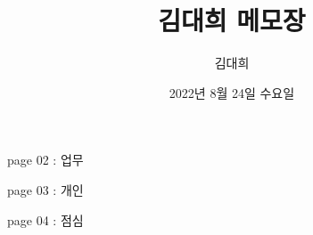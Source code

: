 \documentclass[aspectratio=1610,17pt,xcolor=pdftex,dvipsnames,table,handout]{beamer}
\begin{document}
	

			\title{김대희 메모장}

			\author{김대희}

			\date{ 	2022년 
					8월 
					24일 
					수요일 }


%
%
%
%
%
%
%
%
		\begin{frame}[plain]
		\titlepage
		\end{frame}

		\clearpage



		\begin{frame} [t,plain]

			\begin{block} { page 02  :  업무 }

			\end{block}			
								
		\end{frame}	 %




		\begin{frame} [t,plain]

			\begin{block} { page 03  :  개인 }

			\end{block}			
								
		\end{frame}	 %



		\begin{frame} [t,plain]

			\begin{block} { page 04  :  점심 }

			\end{block}			
								
		\end{frame}	 %
\end{document}
